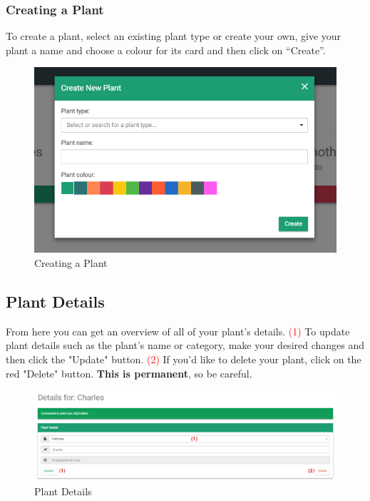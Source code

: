 \documentclass{article}
\begin{document}
		\subsubsection{Creating a Plant}
		\label{sec:creating-a-plant}
		To create a plant, select an existing plant type or create your own, give your plant a name and choose a colour for its card and then click on ``Create''.
		\begin{figure}[H]
			\includegraphics[width=\textwidth]{../images/UserManual/create-plant.png}
			\caption{Creating a Plant}
		\end{figure}
		
	\subsection{Plant Details}
	\label{sec:plant-details}
	From here you can get an overview of all of your plant's details.
	\newline
	\textcolor{red}{(1)} To update plant details such as the plant's name or category, make your desired changes and then click the "Update" button.
	\newline
	\textcolor{red}{(2)} If you'd like to delete your plant, click on the red "Delete" button. \textbf{This is permanent}, so be careful.
	\begin{figure}[H]
		\includegraphics[width=\textwidth]{../images/UserManual/plant-details.png}
		\caption{Plant Details}
	\end{figure}
	
\end{document}
